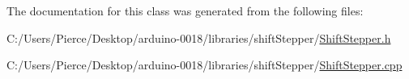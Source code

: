 The documentation for this class was generated from the following files:\begin{DoxyCompactItemize}
\item 
C:/Users/Pierce/Desktop/arduino-\/0018/libraries/shiftStepper/\hyperlink{_shift_stepper_8h}{ShiftStepper.h}\item 
C:/Users/Pierce/Desktop/arduino-\/0018/libraries/shiftStepper/\hyperlink{_shift_stepper_8cpp}{ShiftStepper.cpp}\end{DoxyCompactItemize}
